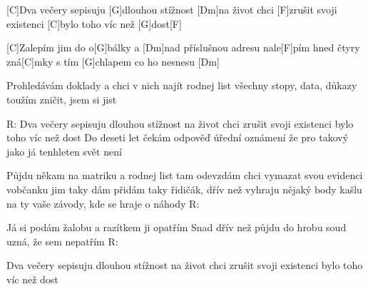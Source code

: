 
[C]Dva večery sepisuju [G]dlouhou stížnost [Dm]na život
chci [F]zrušit svoji existenci [C]bylo toho víc než [G]dost[F]


[C]Zalepím jim do o[G]bálky a [Dm]nad příslušnou adresu
nale[F]pím hned čtyry zná[C]mky s tím [G]chlapem co ho nesnesu [Dm]


Prohledávám doklady a chci v nich najít rodnej list
všechny stopy, data, důkazy toužím zničit, jsem si jist

R: Dva večery sepisuju dlouhou stížnost na život
chci zrušit svoji existenci bylo toho víc než dost
Do deseti let čekám odpověď úřední oznámení
že pro takový jako já tenhleten svět není

Půjdu někam na matriku a rodnej list tam odevzdám
chci vymazat svou evidenci vobčanku jim taky dám
přidám taky řidičák, dřív než vyhraju nějaký body
kašlu na ty vaše závody, kde se hraje o náhody
R:

Já si podám žalobu a razítkem ji opatřím
Snad dřív než půjdu do hrobu soud uzná, že sem nepatřím
R:

Dva večery sepisuju dlouhou stížnost na život
chci zrušit svoji existenci bylo toho víc než dost
